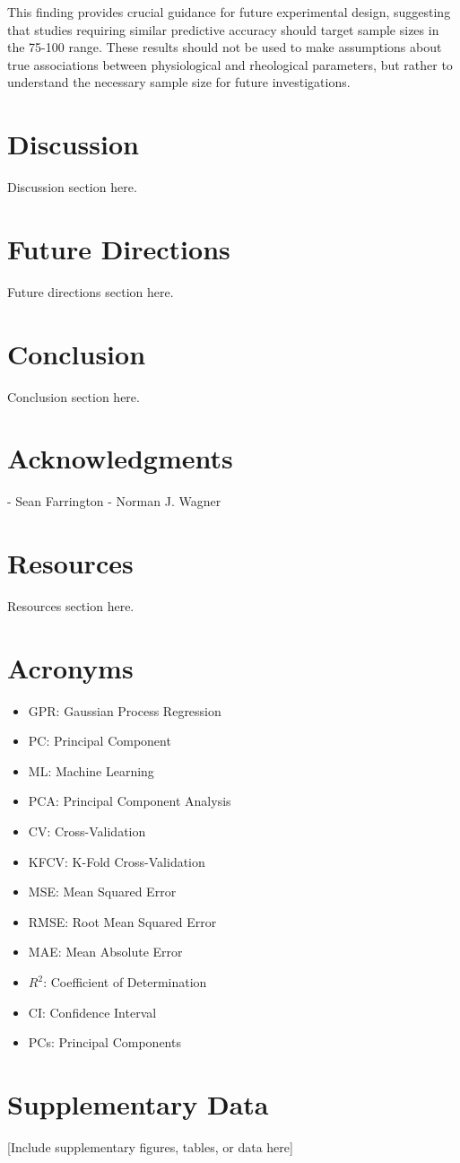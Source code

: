 \documentclass[12pt,letterpaper]{article}
\begin{document}
This finding provides crucial guidance for future experimental design, suggesting that studies requiring similar predictive
accuracy should target sample sizes in the 75-100 range. These results should not be used to make assumptions about true
associations between physiological and rheological parameters, but rather to understand the necessary sample size for future
investigations.

\newpage
\section{Discussion}
Discussion section here.



\newpage
\section{Future Directions}
Future directions section here.

\newpage
\section{Conclusion}
Conclusion section here.

\newpage
\section{Acknowledgments}

- Sean Farrington
- Norman J. Wagner

\newpage
\section{Resources}
Resources section here.

\newpage
\section{Acronyms}
\begin{itemize}
    \item GPR: Gaussian Process Regression
    \item PC: Principal Component
    \item ML: Machine Learning
    \item PCA: Principal Component Analysis
    \item CV: Cross-Validation
    \item KFCV: K-Fold Cross-Validation
    \item MSE: Mean Squared Error
    \item RMSE: Root Mean Squared Error
    \item MAE: Mean Absolute Error
    \item $R^2$: Coefficient of Determination
    \item CI: Confidence Interval
    \item PCs: Principal Components
\end{itemize}

\newpage

\newpage
\appendix

\section{Supplementary Data}
\label{app:supplementary}

[Include supplementary figures, tables, or data here]
\end{document}
